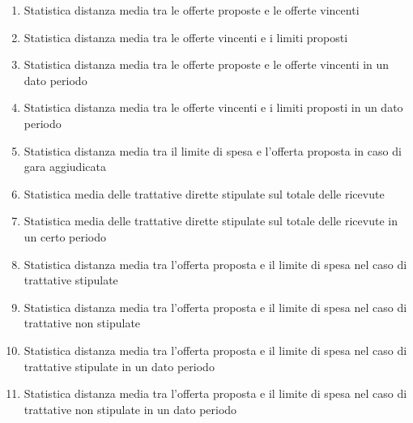 \begin{enumerate}
  \item Statistica distanza media tra le offerte proposte e le offerte vincenti
  \item Statistica distanza media tra le offerte vincenti e i limiti proposti
  \item Statistica distanza media tra le offerte proposte e le offerte vincenti in un dato periodo
  \item Statistica distanza media tra le offerte vincenti e i limiti proposti in un dato periodo
  \item Statistica distanza media tra il limite di spesa e l'offerta proposta in caso di gara aggiudicata
  \item Statistica media delle trattative dirette stipulate sul totale delle ricevute
  \item Statistica media delle trattative dirette stipulate sul totale delle ricevute in un certo periodo
  \item Statistica distanza media tra l'offerta proposta e il limite di spesa nel caso di trattative stipulate
  \item Statistica distanza media tra l'offerta proposta e il limite di spesa nel caso di trattative non stipulate
  \item Statistica distanza media tra l'offerta proposta e il limite di spesa nel caso di trattative stipulate in un dato periodo
  \item Statistica distanza media tra l'offerta proposta e il limite di spesa nel caso di trattative non stipulate in un dato periodo


\end{enumerate}
